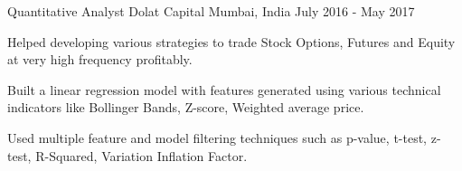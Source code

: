 \begin{cventries}
  \cventry
  {Quantitative Analyst} %
  {Dolat Capital} %
  {Mumbai, India} %
  {July 2016 - May 2017} %
  {
  \begin{cvitems} %
    \item {Helped developing various strategies to trade Stock Options, Futures and Equity at very high frequency profitably.}
    \item {Built a linear regression model with features generated using various technical indicators like Bollinger Bands, Z-score, Weighted average price.}
    \item {Used multiple feature and model filtering techniques such as p-value, t-test, z-test, R-Squared, Variation Inflation Factor.}
  \end{cvitems}
  }
\end{cventries}
  